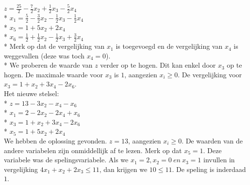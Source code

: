 \documentclass[10pt]{article}
\begin{document}
$z = \frac{25}{2} - \frac{7}{2}x_2 + \frac{1}{2}x_3 - \frac{5}{2}x_4$\\*
$x_1 = \frac{5}{2} - \frac{3}{2}x_2 - \frac{1}{2}x_3 - \frac{1}{2}x_4$\\*
$x_5 = 1 + 5x_2 + 2x_4$\\*
$x_6 = \frac{1}{2} + \frac{1}{2}x_2 - \frac{1}{2}x_3 + \frac{3}{2}x_4$\\*
Merk op dat de vergelijking van $x_1$ is toegevoegd en de vergelijking van $x_4$ is weggevallen (deze was toch $x_4 = 0$).\\*
We proberen de waarde van $z$ verder op te hogen. Dit kan enkel door $x_3$ op te hogen. De maximale waarde voor $x_3$ is $1$, aangezien $x_i \ge 0$. De vergelijking voor $x_3 = 1 + x_2 + 3x_4 - 2x_6$.\\
Het nieuwe stelsel:\\*
$z = 13 - 3x_2 - x_4 - x_6$\\*
$x_1 = 2 - 2x_2 - 2x_4 + x_6$\\*
$x_3 = 1 + x_2 + 3x_4 - 2x_6$\\*
$x_5 = 1 + 5x_2 + 2x_4$\\
We hebben de oplossing gevonden. $z = 13$, aangezien $x_i \ge 0$. De waarden van de andere variabelen zijn onmiddellijk af te lezen. Merk op dat $x_5 = 1$. Deze variabele was de spelingsvariabele. Als we $x_1 = 2, x_2 = 0\ en\ x_3 = 1$ invullen in vergelijking $4x_1 + x_2 + 2x_3 \le 11$, dan krijgen we $10 \le 11$. De speling is inderdaad $1$.
\end{document}
